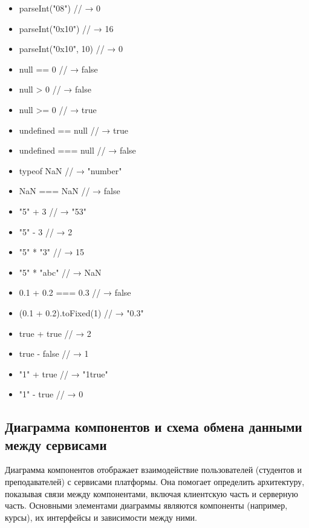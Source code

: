 \begin{itemize}
  \item parseInt("08") // → 0
  \item parseInt("0x10") // → 16
  \item parseInt("0x10", 10) // → 0
  \item null == 0 // → false
  \item null > 0 // → false
  \item null >= 0 // → true
  \item undefined == null // → true
  \item undefined === null // → false
  \item typeof NaN // → "number"
  \item NaN === NaN // → false
  \item "5" + 3 // → "53"
  \item "5" - 3 // → 2
  \item "5" * "3" // → 15
  \item "5" * "abc" // → NaN
  \item 0.1 + 0.2 === 0.3 // → false
  \item (0.1 + 0.2).toFixed(1) // → "0.3"
  \item true + true // → 2
  \item true - false // → 1
  \item "1" + true // → "1true"
  \item "1" - true // → 0
\end{itemize}



\subsection{Диаграмма компонентов и схема обмена данными между сервисами}

Диаграмма компонентов отображает взаимодействие пользователей (студентов и преподавателей) с сервисами платформы. Она помогает определить архитектуру, показывая связи между компонентами, включая клиентскую часть и серверную часть. Основными элементами диаграммы являются компоненты (например, курсы), их интерфейсы и зависимости между ними.

